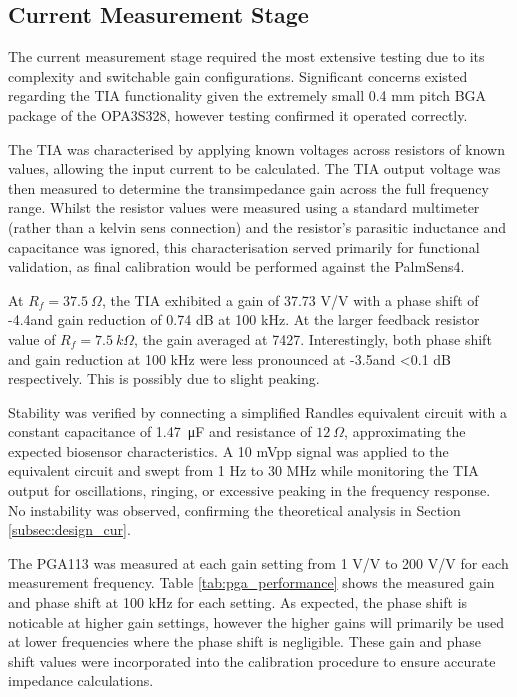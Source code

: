

\subsection{Current Measurement Stage} 
The current measurement stage required the most extensive testing due to its complexity and switchable gain configurations. Significant concerns existed regarding the TIA functionality given the extremely small 0.4 mm pitch BGA package of the OPA3S328, however testing confirmed it operated correctly.

The TIA was characterised by applying known voltages across resistors of known values, allowing the input current to be calculated. The TIA output voltage was then measured to determine the transimpedance gain across the full frequency range. Whilst the resistor values were measured using a standard multimeter (rather than a kelvin sens connection) and the resistor's parasitic inductance and capacitance was ignored, this characterisation served primarily for functional validation, as final calibration would be performed against the PalmSens4. 

At $R_f = 37.5~\Omega$, the TIA exhibited a gain of 37.73 V/V with a phase shift of -4.4\textdegree and gain reduction of 0.74 dB at 100 kHz. At the larger feedback resistor value of $R_f = 7.5~k\Omega$, the gain averaged at 7427. Interestingly, both phase shift and gain reduction  at 100 kHz were less pronounced at -3.5\textdegree and \textless 0.1 dB respectively. This is possibly due to slight peaking.

Stability was verified by connecting a simplified Randles equivalent circuit with a constant capacitance of \SI{1.47}{\micro F} and resistance of $12~\Omega$, approximating the expected biosensor characteristics. A 10 mVpp signal was applied to the equivalent circuit and swept from 1 Hz to 30 MHz while monitoring the TIA output for oscillations, ringing, or excessive peaking in the frequency response. No instability was observed, confirming the theoretical analysis in Section \ref{subsec:design_cur}.

The PGA113 was measured at each gain setting from 1 V/V to 200 V/V for each measurement frequency. Table \ref{tab:pga_performance} shows the measured gain and phase shift at 100 kHz for each setting. As expected, the phase shift is noticable at higher gain settings, however the higher gains will primarily be used at lower frequencies where the phase shift is negligible. These gain and phase shift values were incorporated into the calibration procedure to ensure accurate impedance calculations.

